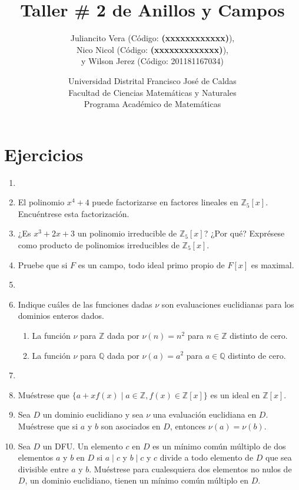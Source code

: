 \documentclass[12pt]{article}
\title{Taller \# 2 de Anillos y Campos}
\author{
    Juliancito Vera (Código: \textbf{(xxxxxxxxxxxx)}), \\
    Nico Nicol (Código: \textbf{(xxxxxxxxxxxxx)}), \\
    y Wilson Jerez (Código: 201181167034)
}
\date{
    Universidad Distrital Francisco José de Caldas \\
    Facultad de Ciencias Matemáticas y Naturales \\
    Programa Académico de Matemáticas
}
\theoremstyle{definition}
\theoremstyle{remark}
\begin{document}
\maketitle

\section*{Ejercicios}

\begin{enumerate}
    \item 
    
    \item El polinomio $x^4 + 4$ puede factorizarse en factores lineales en $\mathbb{Z}_5[x]$. Encuéntrese esta factorización.
    
    \item ¿Es $x^3 + 2x + 3$ un polinomio irreducible de $\mathbb{Z}_5[x]$? ¿Por qué? Exprésese como producto de polinomios irreducibles de $\mathbb{Z}_5[x]$.
    
    \item Pruebe que si $F$ es un campo, todo ideal primo propio de $F[x]$ es maximal.
    
    \item 
    
    \item Indique cuáles de las funciones dadas $\nu$ son evaluaciones euclidianas para los dominios enteros dados.
    \begin{enumerate}
        \item La función $\nu$ para $\mathbb{Z}$ dada por $\nu(n) = n^2$ para $n \in \mathbb{Z}$ distinto de cero.
        \item La función $\nu$ para $\mathbb{Q}$ dada por $\nu(a) = a^2$ para $a \in \mathbb{Q}$ distinto de cero.
    \end{enumerate}
    
    \item 
    
    \item Muéstrese que $\{a+ xf(x) \mid a \in \mathbb{Z}, f(x) \in \mathbb{Z}[x]\}$ es un ideal en $\mathbb{Z}[x]$.
    
    \item Sea $D$ un dominio euclidiano y sea $\nu$ una evaluación euclidiana en $D$. Muéstrese que si $a$ y $b$ son asociados en $D$, entonces $\nu(a) = \nu(b)$.
    
    \item Sea $D$ un DFU. Un elemento $c$ en $D$ es un mínimo común múltiplo de dos elementos $a$ y $b$ en $D$ si $a \mid c$ y $b \mid c$ y $c$ divide a todo elemento de $D$ que sea divisible entre $a$ y $b$. Muéstrese para cualesquiera dos elementos no nulos de $D$, un dominio euclidiano, tienen un mínimo común múltiplo en $D$.
    

\end{enumerate}
\end{document}
